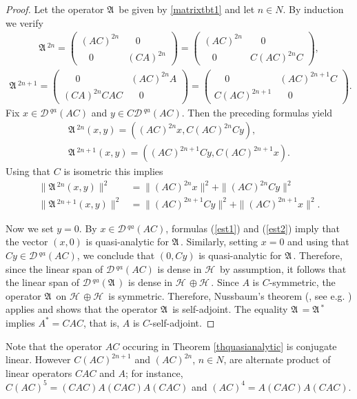 \documentclass[12pt]{amsart}
\theoremstyle{definition}
\newcommand{\gA}{\mathfrak{A}\,}
\newcommand{\cD}{\mathcal{D}\,}
\newcommand{\cH}{\mathcal{H}\,}
\begin{document}
\begin{proof}
Let the operator $\gA$ be given by \eqref{matrixtbt1} and let $n\in N$. By induction we verify
\begin{gather*}
\gA^{2n}=\left(
\begin{array}{ll}
(AC)^{2n} & ~~~~ 0 \\
~~~~ 0 & (CA)^{2n}
\end{array}\right)=\left(
\begin{array}{ll}
(AC)^{2n}  & ~~~~~ 0 \\
~~~~0 & C(AC)^{2n}C
\end{array}\right),
\end{gather*}\begin{gather*}
\gA^{2n+1}=\left(
\begin{array}{ll}
~~~~~~ 0 & (AC)^{2n}A \\
 (CA)^{2n}CAC &~~~~ 0
\end{array}\right)=\left(
\begin{array}{ll}
~~~~~ 0 & (AC)^{2n+1}C\\
 C(AC)^{2n+1} & ~~~~ 0
\end{array}\right).
\end{gather*}
Fix  $x\in \cD^{qa}(AC)$ and $y\in C\cD^{qa}(AC)$.  Then the preceding formulas yield
\[\begin{array}{l}
\gA^{2n}(x,y)=((AC)^{2n}x, C(AC)^{2n}Cy), \\[2mm]
 \gA^{2n+1 }(x,y)=((AC)^{2n+1}Cy, C(AC)^{2n+1}x).%
\end{array}
\]
Using that $C$ is isometric this implies
\begin{align}\label{est1}
\|\gA^{2n}(x,y)\|^2&=\|(AC)^{2n}x\|^2 + \| (AC)^{2n}Cy\|^2\\ \|\gA^{2n+1}(x,y)\|^2&=\|(AC)^{2n+1}Cy\|^2 + \| (AC)^{2n+1}x\|^2.\label{est2}
\end{align}

Now we set $y=0$. By  $x\in \cD^{qa}(AC)$, formulas (\ref{est1}) and (\ref{est2}) imply that the vector $(x,0)$ is quasi-analytic for $\gA$. Similarly, setting $x=0$ and using that  $Cy\in \cD^{qa}(AC)$, we conclude  that $(0,Cy)$ is quasi-analytic for $\gA$. Therefore, since the linear span of $ \cD^{qa}(AC)$  is dense in $\cH$ by assumption, it follows that the linear span of $ \cD^{qa}(\gA)$ is dense in $\cH\oplus\cH$. Since $A$ is $C$-symmetric, the operator $\gA$ on $\cH\oplus\cH$ is symmetric. Therefore, Nussbaum's theorem (\cite{nussbaum}, see e.g. \cite[Theorem 7.14]{sch12}) applies and shows that the operator $\gA$ is self-adjoint. The equality $\gA=\gA^*$ implies $A^*=CAC$, that is, $A$ is $C$-self-adjoint.
\end{proof}
Note that the operator $AC$ occuring in Theorem \ref{thquasianalytic} is conjugate linear. However $C(AC)^{2n+1}$ and $(AC)^{2n}$, $n\in N$, are alternate product of linear operators $CAC$ and $A$; for instance,
$C(AC)^5=(CAC)A(CAC)A(CAC)$ and $(AC)^4=A(CAC)A(CAC)$.
\end{document}
